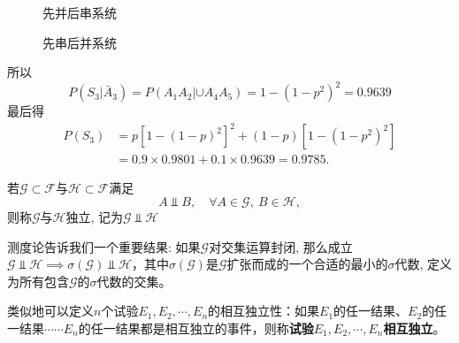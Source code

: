 \begin{solution}
\begin{figure}[!ht]
\begin{minipage}{0.48\linewidth}
            \caption{先并后串系统\label{fig1.5.1}}
        \end{minipage}
        \begin{minipage}{0.48\linewidth}
            \centering
            \caption{先串后并系统\label{fig1.5.2}}
        \end{minipage}
    \end{figure}
    所以
    \[ P(S_3|\bar A_3) = P(A_1A_2|\cup A_4A_5) = 1 - (1-p^2)^2 = 0.9639 \]
    最后得
    \begin{align*}
        P(S_3) & = p [ 1-(1-p)^2 ]^2 + (1-p)[ 1-(1-p^2)^2 ]       \\
               & = 0.9\times 0.9801 + 0.1 \times 0.9639 = 0.9785.
    \end{align*}
\end{solution}

\begin{definition}[事件域的独立性]
    若$\mathscr{G} \subset \mathscr{F}$与$\mathscr{H} \subset \mathscr{F}$满足
    \[ A \Vbar B, \quad \forall A\in\mathscr{G},\ B\in\mathscr{H}, \]
    则称$\mathscr{G}$与$\mathscr{H}$独立, 记为$\mathscr{G} \Vbar \mathscr{H}$
\end{definition}

测度论告诉我们一个重要结果: 如果$\mathscr{G}$对交集运算封闭, 那么成立$\mathscr{G}\Vbar\mathscr{H} \implies \sigma(\mathscr{G}) \Vbar \mathscr{H}$，其中$\sigma(\mathscr{G})$是$\mathscr{G}$扩张而成的一个合适的最小的$\sigma$代数, 定义为所有包含$\mathscr{G}$的$\sigma$代数的交集。

类似地可以定义$n$个试验$E_1,E_2,\cdots,E_n$的相互独立性：如果$E_1$的任一结果、$E_2$的任一结果$\cdots\cdots E_n$的任一结果都是相互独立的事件，则称\textbf{试验$E_1,E_2,\cdots,E_n$相互独立}。

